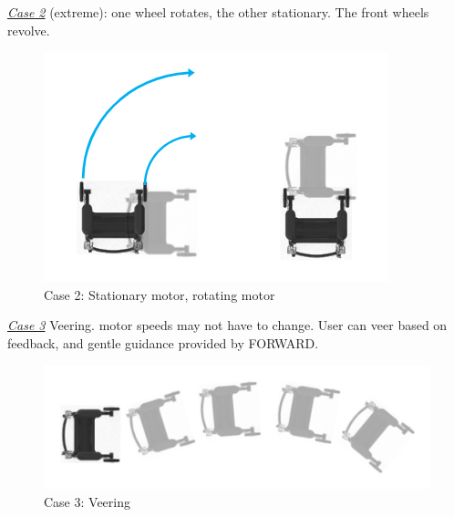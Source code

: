 \noindent \underline{\textit{Case 2}} (extreme): one wheel rotates, the other stationary. The front wheels revolve.\\

\begin{figure}[H]
	\centering
	\includegraphics[width=.5\textwidth]{./Images/case2.png}
	\caption{\label{fig:case-two}Case 2: Stationary motor, rotating motor}
\end{figure}

\noindent \underline{\textit{Case 3}} Veering. motor speeds may not have to change. User can veer based on feedback, and gentle guidance provided by FORWARD.\\

\begin{figure}[H]
	\centering
	\includegraphics[width=.5\textwidth]{./Images/case3.png}
	\caption{\label{fig:case-three}Case 3: Veering}
\end{figure}

